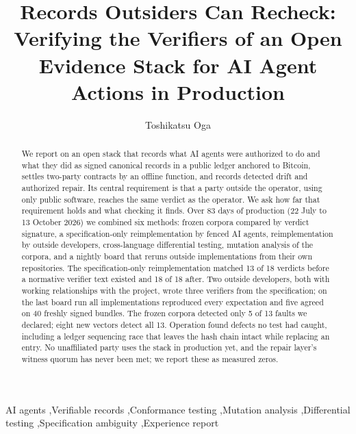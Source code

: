\documentclass[preprint,12pt,authoryear]{elsarticle}
\begin{document}
\begin{frontmatter}
\title{Records Outsiders Can Recheck: Verifying the Verifiers of an Open Evidence Stack for AI Agent Actions in Production}
\author{Toshikatsu Oga}

\begin{abstract}
We report on an open stack that records what AI agents were authorized to do and what they did as signed canonical records in a public ledger anchored to Bitcoin, settles two-party contracts by an offline function, and records detected drift and authorized repair. Its central requirement is that a party outside the operator, using only public software, reaches the same verdict as the operator. We ask how far that requirement holds and what checking it finds. Over 83 days of production (22 July to 13 October 2026) we combined six methods: frozen corpora compared by verdict signature, a specification-only reimplementation by fenced AI agents, reimplementation by outside developers, cross-language differential testing, mutation analysis of the corpora, and a nightly board that reruns outside implementations from their own repositories. The specification-only reimplementation matched 13 of 18 verdicts before a normative verifier text existed and 18 of 18 after. Two outside developers, both with working relationships with the project, wrote three verifiers from the specification; on the last board run all implementations reproduced every expectation and five agreed on 40 freshly signed bundles. The frozen corpora detected only 5 of 13 faults we declared; eight new vectors detect all 13. Operation found defects no test had caught, including a ledger sequencing race that leaves the hash chain intact while replacing an entry. No unaffiliated party uses the stack in production yet, and the repair layer's witness quorum has never been met; we report these as measured zeros.
\end{abstract}

\begin{keyword}
AI agents \sep Verifiable records \sep Conformance testing \sep Mutation analysis \sep Differential testing \sep Specification ambiguity \sep Experience report
\end{keyword}
\end{frontmatter}
\end{document}
